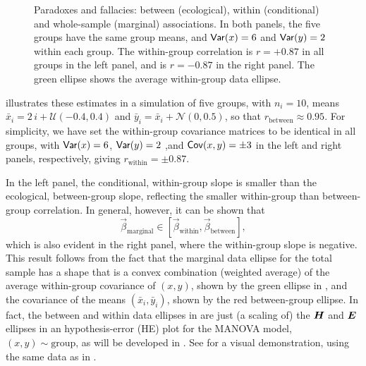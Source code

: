 \begin{figure}[htb]
\begin{minipage}[b]{.49\linewidth}
 \end{minipage}
  \caption{Paradoxes and fallacies: between (ecological), within (conditional) and whole-sample (marginal) associations.
  In both panels, the five groups have the same group means, and $\mathsf{Var}(x)=6$ and $\mathsf{Var}(y)=2$ within each group.
  The within-group correlation is $r = +0.87$ in all groups in the left panel, and is $r = -0.87$ in the right panel.
  The green ellipse shows the average within-group data ellipse.}
  \label{fig:between-within}
\end{figure}

 illustrates these estimates in a simulation of five groups, with $n_i=10$,  means
$\bar{x}_i = 2 \, i + \mathcal{U}(-0.4, 0.4)$  and
$\bar{y}_i = \bar{x}_i + \mathcal{N}(0, 0.5)$, so that $r_{\textrm{between}} \approx 0.95$.
For simplicity, we have set the within-group covariance matrices to be identical in all groups, with
$\mathsf{Var}(x)=6$, $\mathsf{Var}(y)=2$ ,and $\mathsf{Cov}(x,y)=\pm 3$ in the left and right panels, respectively, giving
$r_{\textrm{within}} = \pm 0.87$.

In the left panel, the conditional, within-group slope is smaller than the ecological, between-group slope,
reflecting the smaller within-group than between-group correlation.
In general, however, it can be shown that
\begin{equation*}
\vec{\beta}_{\textrm{marginal}} \in [\vec{\beta}_{\textrm{within}} , \vec{\beta}_{\textrm{between}} ] \comma
\end{equation*}
which is also evident in the right panel, where the within-group slope is negative.
This result follows from the fact that the marginal data ellipse for the total sample
has a shape that is a convex combination (weighted average) of the average within-group
covariance of $(x, y)$, shown by the green ellipse in  ,
and the  covariance of the means $(\bar{x}_i, \bar{y}_i)$, shown by the red between-group ellipse.
In fact, the between and within data ellipses in  
are just (a scaling of) the $\bm{H}$ and $\bm{E}$ ellipses in an hypothesis-error (HE) plot for the
MANOVA model, $(x, y) \sim \textrm{group}$, as will be developed in .
See  for a visual demonstration, using the same data  as in   .

